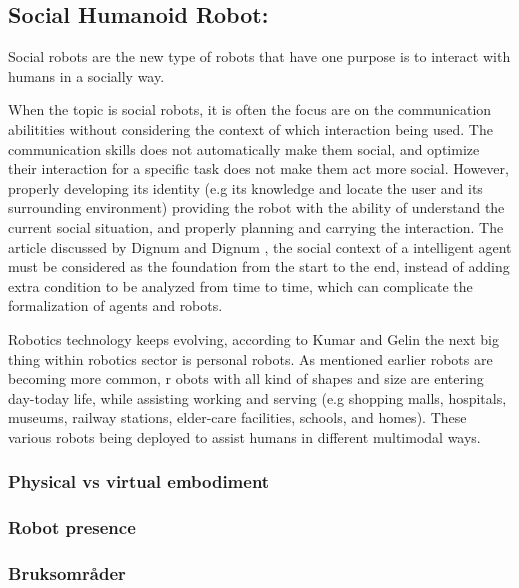 \documentclass[fleqn,10pt]{wlscirep}
\begin{document}
\subsection{Social Humanoid Robot:}
Social robots are the new type of robots that have one purpose is to interact with humans in a socially way\cite{Lee}. 


When the topic is social robots, it is often the focus are on the communication abilitities without considering the context of which interaction being used. The communication skills does not automatically make them social, and optimize their interaction for a specific task does not make them act more social.  However, properly developing its identity (e.g its knowledge and locate the user and its surrounding environment) providing the robot with the ability  of understand the current social situation, and properly planning and carrying  the interaction. The article discussed by Dignum and Dignum \cite{dignum}, the social context of a intelligent agent  must be considered as the foundation from the start to the end, instead of adding extra condition to be analyzed  from time to time, which can complicate the formalization of agents and robots. 

Robotics technology keeps evolving, according to Kumar and Gelin \cite{Kumar} the next big thing within robotics sector is personal robots. As mentioned earlier robots are becoming more common, r
obots with all kind of shapes and size are entering day-today life, while assisting working and serving (e.g shopping malls, hospitals, museums, railway stations, elder-care facilities, schools, and homes). These various robots being deployed to assist humans in different multimodal ways.

\subsubsection{Physical vs virtual embodiment}


\subsubsection{Robot presence}



\subsubsection{Bruksområder}
\end{document}
